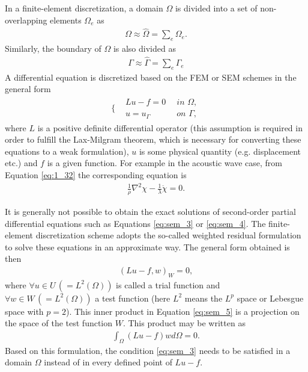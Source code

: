            In a finite-element discretization, a domain $\Omega$ is divided into a set of non-overlapping elements $\Omega_{e}$ as
            \begin{align} \label{eq:sem_1}
                \Omega\approx\hat{\Omega}=\sum_{e}\Omega_e.
            \end{align}
            Similarly, the boundary of $\Omega$ is also divided as
            \begin{align} \label{eq:sem_2}
                \Gamma\approx\hat{\Gamma}=\sum_{e}\Gamma_e
            \end{align}
            A differential equation is discretized based on the FEM or SEM schemes in the general form
            \begin{align} \label{eq:sem_3}
                \Biggl\{ \begin{matrix}
                    &Lu-f=0\,\,\,     &in\,\,\Omega , \\
                    &u=u_\Gamma\,\,\, &on\,\,\Gamma ,
                \end{matrix}
            \end{align}
            where $L$ is a positive definite differential operator (this assumption is required in order to fulfill the Lax-Milgram theorem, which is necessary
for converting these equations to a weak formulation), $u$ is some physical quantity (e.g. displacement etc.) and $f$ is a given function.
            For example in the acoustic wave case, from Equation \ref{eq:1_32} the corresponding equation is
            \begin{align} \label{eq:sem_4}
                \frac{1}{\rho}\nabla^2\chi-\frac{1}{\lambda}\ddot{\chi}=0.
            \end{align}

            It is generally not possible to obtain the exact solutions of second-order partial differential equations such as Equations \ref{eq:sem_3} or
\ref{eq:sem_4}. The finite-element discretization scheme adopts the so-called weighted residual formulation to solve these equations in an approximate way.
The general form obtained is then
            \begin{align} \label{eq:sem_5}
                (Lu-f,w)_W=0,
            \end{align}
            where $\forall u\in U\,(=L^2(\Omega))$ is called a trial function and $\forall w\in W\,(=L^2(\Omega))$ a test function (here $L^2$ means the $L^p$
space or Lebesgue space with $p=2$).
This inner product in Equation \ref{eq:sem_5} is a projection on the space of the test function $W$.
            This product may be written as
            \begin{align} \label{eq:sem_6}
                \int_{\Omega}(Lu-f)wd\Omega=0.
            \end{align}
            Based on this formulation, the condition \ref{eq:sem_3} needs to be satisfied in a domain $\Omega$ instead of in every defined point of $Lu-f$.

